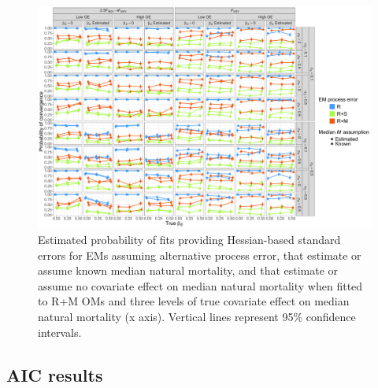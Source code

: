 \documentclass[
  12pt,
]{article}
\begin{document}
\begin{landscape}
\begin{figure}
\begin{center}
\includegraphics{convergence_RMom}
\end{center}
\caption{Estimated probability of fits providing Hessian-based standard errors for EMs assuming alternative process error, that estimate or assume known median natural mortality, and that estimate or assume no covariate effect on median natural mortality when fitted to R+M OMs and three levels of true covariate effect on median natural mortality (x axis). Vertical lines represent 95\% confidence intervals.}\label{convergence_RMom}
\end{figure}
\end{landscape}

\hypertarget{aic-results}{%
\subsection*{AIC results}\label{aic-results}}
\end{document}
